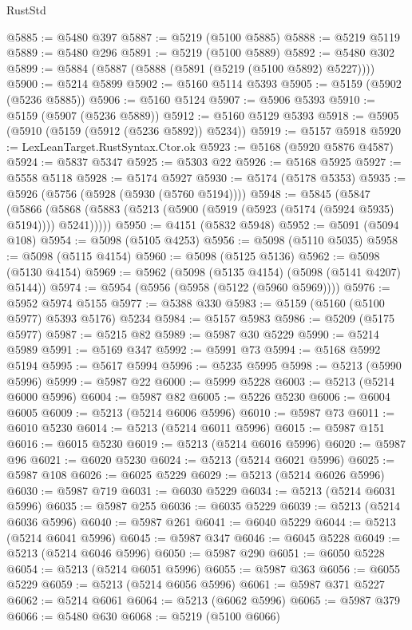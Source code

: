 \begin{lexlean}{RustStd}
\begin{coremodule}
@5885 := @5480 @397
@5887 := @5219 (@5100 @5885)
@5888 := @5219 @5119
@5889 := @5480 @296
@5891 := @5219 (@5100 @5889)
@5892 := @5480 @302
@5899 := @5884 (@5887 (@5888 (@5891 (@5219 (@5100 @5892) @5227))))
@5900 := @5214 @5899
@5902 := @5160 @5114 @5393
@5905 := @5159 (@5902 (@5236 @5885))
@5906 := @5160 @5124
@5907 := @5906 @5393
@5910 := @5159 (@5907 (@5236 @5889))
@5912 := @5160 @5129 @5393
@5918 := @5905 (@5910 (@5159 (@5912 (@5236 @5892)) @5234))
@5919 := @5157 @5918
@5920 := LexLeanTarget.RustSyntax.Ctor.ok
@5923 := @5168 (@5920 @5876 @4587)
@5924 := @5837 @5347
@5925 := @5303 @22
@5926 := @5168 @5925
@5927 := @5558 @5118
@5928 := @5174 @5927
@5930 := @5174 (@5178 @5353)
@5935 := @5926 (@5756 (@5928 (@5930 (@5760 @5194))))
@5948 := @5845
    (@5847
      (@5866 (@5868 (@5883 (@5213 (@5900 (@5919 (@5923 (@5174 (@5924 @5935) @5194)))) @5241)))))
@5950 := @4151 (@5832 @5948)
@5952 := @5091 (@5094 @108)
@5954 := @5098 (@5105 @4253)
@5956 := @5098 (@5110 @5035)
@5958 := @5098 (@5115 @4154)
@5960 := @5098 (@5125 @5136)
@5962 := @5098 (@5130 @4154)
@5969 := @5962 (@5098 (@5135 @4154) (@5098 (@5141 @4207) @5144))
@5974 := @5954 (@5956 (@5958 (@5122 (@5960 @5969))))
@5976 := @5952 @5974 @5155
@5977 := @5388 @330
@5983 := @5159 (@5160 (@5100 @5977) @5393 @5176) @5234
@5984 := @5157 @5983
@5986 := @5209 (@5175 @5977)
@5987 := @5215 @82
@5989 := @5987 @30 @5229
@5990 := @5214 @5989
@5991 := @5169 @347
@5992 := @5991 @73
@5994 := @5168 @5992 @5194
@5995 := @5617 @5994
@5996 := @5235 @5995
@5998 := @5213 (@5990 @5996)
@5999 := @5987 @22
@6000 := @5999 @5228
@6003 := @5213 (@5214 @6000 @5996)
@6004 := @5987 @82
@6005 := @5226 @5230
@6006 := @6004 @6005
@6009 := @5213 (@5214 @6006 @5996)
@6010 := @5987 @73
@6011 := @6010 @5230
@6014 := @5213 (@5214 @6011 @5996)
@6015 := @5987 @151
@6016 := @6015 @5230
@6019 := @5213 (@5214 @6016 @5996)
@6020 := @5987 @96
@6021 := @6020 @5230
@6024 := @5213 (@5214 @6021 @5996)
@6025 := @5987 @108
@6026 := @6025 @5229
@6029 := @5213 (@5214 @6026 @5996)
@6030 := @5987 @719
@6031 := @6030 @5229
@6034 := @5213 (@5214 @6031 @5996)
@6035 := @5987 @255
@6036 := @6035 @5229
@6039 := @5213 (@5214 @6036 @5996)
@6040 := @5987 @261
@6041 := @6040 @5229
@6044 := @5213 (@5214 @6041 @5996)
@6045 := @5987 @347
@6046 := @6045 @5228
@6049 := @5213 (@5214 @6046 @5996)
@6050 := @5987 @290
@6051 := @6050 @5228
@6054 := @5213 (@5214 @6051 @5996)
@6055 := @5987 @363
@6056 := @6055 @5229
@6059 := @5213 (@5214 @6056 @5996)
@6061 := @5987 @371 @5227
@6062 := @5214 @6061
@6064 := @5213 (@6062 @5996)
@6065 := @5987 @379
@6066 := @5480 @630
@6068 := @5219 (@5100 @6066)

\end{coremodule}
\end{lexlean}
